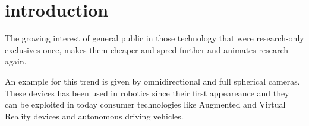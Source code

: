 \chapter{introduction}
The growing interest of general public in those technology that were 
research-only exclusives once, makes them cheaper and spred further and
animates research again.

An example for this trend is given by omnidirectional and full spherical 
cameras.
These devices has been used in robotics since their first appeareance and they 
can be exploited in today consumer technologies like Augmented and Virtual 
Reality devices and autonomous driving vehicles.


